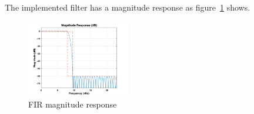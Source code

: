 The implemented filter has a magnitude response as figure~\ref{fig:fir_mag_response} shows.

\begin{figure}
    \centering
    \includegraphics[width=0.4\textwidth]{Images/fir_minimum_mag_response.png}
    \caption{FIR magnitude response}
    \label{fig:fir_mag_response}
\end{figure}